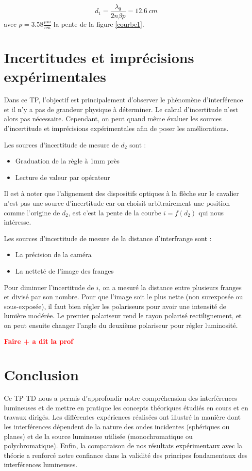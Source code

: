 \documentclass[11pt, a4paper]{article}
\begin{document}
$$
    d_1 =  \frac{\lambda_0}{2n\beta p} = 12.6\ cm
$$
avec $p=3.58 \frac{\mu m}{cm}$ la pente de la figure \ref{courbe1}.

\section{Incertitudes et imprécisions expérimentales}
Dans ce TP, l'objectif est principalement d'observer le phénomène d'interférence et il n'y a pas de grandeur physique à déterminer. Le calcul d'incertitude n'est alors pas nécessaire. Cependant, on peut quand même évaluer les sources d'incertitude et imprécisions expérimentales afin de poser les améliorations.

Les sources d'incertitude de mesure de $d_2$ sont :
\begin{itemize}
    \item Graduation de la règle à 1mm près
    \item Lecture de valeur par opérateur
\end{itemize}

Il est à noter que l'alignement des dispositifs optiques à la flèche sur le cavalier n'est pas une source d'incertitude car on choisit arbitrairement une position comme l'origine de $d_2$, est c'est la pente de la courbe $i=f(d_2)$ qui nous intéresse.

Les sources d'incertitude de mesure de la distance d'interfrange sont :
\begin{itemize}
    \item La précision de la caméra
    \item La netteté de l'image des franges
\end{itemize}

Pour diminuer l'incertitude de $i$, on a mesuré la distance entre plusieurs franges et divisé par son nombre. Pour que l'image soit le plus nette (non surexposée ou sous-exposée), il faut bien régler les polariseurs pour avoir une intensité de lumière modérée. Le premier polariseur rend le rayon polarisé rectilignement, et on peut ensuite changer l'angle du deuxième polariseur pour régler luminosité.

\textbf{\textcolor{red}{Faire + a dit la prof}}

\section{Conclusion}
Ce TP-TD nous a permis d'approfondir notre compréhension des interférences lumineuses et de mettre en pratique les concepts théoriques étudiés en cours et en travaux dirigés. Les différentes expériences réalisées ont illustré la manière dont les interférences dépendent de la nature des ondes incidentes (sphériques ou planes) et de la source lumineuse utilisée (monochromatique ou polychromatique). Enfin, la comparaison de nos résultats expérimentaux avec la théorie a renforcé notre confiance dans la validité des principes fondamentaux des interférences lumineuses.
\end{document}
